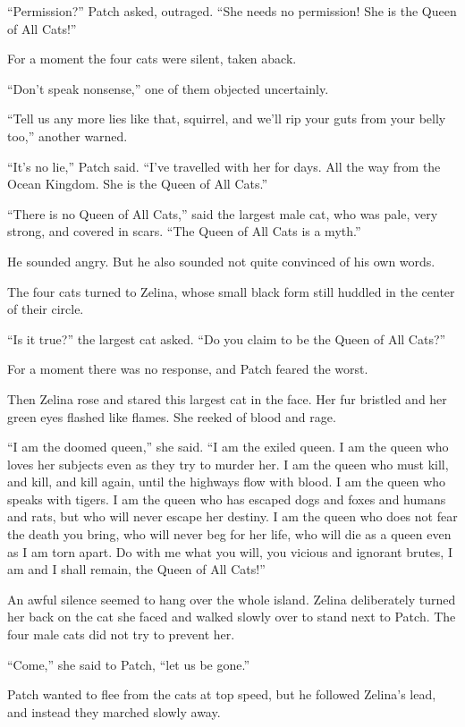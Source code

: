 \documentclass[ebook,oneside,openany,12pt]{memoir}
\begin{document}
“Permission?” Patch asked, outraged. “She needs no permission! She is
the Queen of All Cats!”

For a moment the four cats were silent, taken aback.

“Don’t speak nonsense,” one of them objected uncertainly.

“Tell us any more lies like that, squirrel, and we’ll rip your guts
from your belly too,” another warned.

“It’s no lie,” Patch said. “I’ve travelled with her for days. All the
way from the Ocean Kingdom. She is the Queen of All Cats.”

“There is no Queen of All Cats,” said the largest male cat, who was
pale, very strong, and covered in scars. “The Queen of All Cats is a
myth.”

He sounded angry. But he also sounded not quite convinced of his own
words.

The four cats turned to Zelina, whose small black form still huddled
in the center of their circle.

“Is it true?” the largest cat asked. “Do you claim to be the Queen of
All Cats?”

For a moment there was no response, and Patch feared the worst.

Then Zelina rose and stared this largest cat in the face. Her fur
bristled and her green eyes flashed like flames. She reeked of blood
and rage.

“I am the doomed queen,” she said. “I am the exiled queen. I am the
queen who loves her subjects even as they try to murder her. I am the
queen who must kill, and kill, and kill again, until the highways flow
with blood. I am the queen who speaks with tigers. I am the queen who
has escaped dogs and foxes and humans and rats, but who will never
escape her destiny. I am the queen who does not fear the death you
bring, who will never beg for her life, who will die as a queen even
as I am torn apart. Do with me what you will, you vicious and ignorant
brutes, I am and I shall remain, the Queen of All Cats!”

An awful silence seemed to hang over the whole island. Zelina
deliberately turned her back on the cat she faced and walked slowly
over to stand next to Patch. The four male cats did not try to prevent
her.

“Come,” she said to Patch, “let us be gone.”

Patch wanted to flee from the cats at top speed, but he followed
Zelina’s lead, and instead they marched slowly away.
\end{document}
